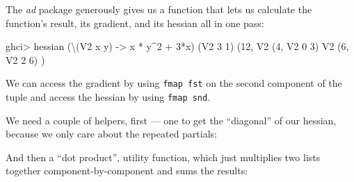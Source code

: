 \documentclass[]{article}
\newenvironment{Shaded}{}{}
\newcommand{\CommentTok}[1]{\textcolor[rgb]{0.38,0.63,0.69}{\textit{#1}}}
\newcommand{\DataTypeTok}[1]{\textcolor[rgb]{0.56,0.13,0.00}{#1}}
\newcommand{\DecValTok}[1]{\textcolor[rgb]{0.25,0.63,0.44}{#1}}
\newcommand{\FunctionTok}[1]{\textcolor[rgb]{0.02,0.16,0.49}{#1}}
\newcommand{\KeywordTok}[1]{\textcolor[rgb]{0.00,0.44,0.13}{\textbf{#1}}}
\newcommand{\NormalTok}[1]{#1}
\newcommand{\OperatorTok}[1]{\textcolor[rgb]{0.40,0.40,0.40}{#1}}
\newcommand{\OtherTok}[1]{\textcolor[rgb]{0.00,0.44,0.13}{#1}}
\begin{document}
The \emph{ad} package generously gives us a function that lets us calculate the
function's result, its gradient, and its hessian all in one pass:

\begin{Shaded}
\begin{Highlighting}[]
\NormalTok{ghci}\OperatorTok{>}\NormalTok{ hessian\textquotesingle{} (\textbackslash{}(}\DataTypeTok{V2}\NormalTok{ x y) }\OtherTok{{-}>}\NormalTok{ x }\OperatorTok{*}\NormalTok{ y}\OperatorTok{\^{}}\DecValTok{2} \OperatorTok{+} \DecValTok{3}\OperatorTok{*}\NormalTok{x) (}\DataTypeTok{V2} \DecValTok{3} \DecValTok{1}\NormalTok{)}
\NormalTok{(}\DecValTok{12}\NormalTok{, }\DataTypeTok{V2}\NormalTok{ (}\DecValTok{4}\NormalTok{, }\DataTypeTok{V2} \DecValTok{0} \DecValTok{3}\NormalTok{)}
     \DataTypeTok{V2}\NormalTok{ (}\DecValTok{6}\NormalTok{, }\DataTypeTok{V2} \DecValTok{2} \DecValTok{6}\NormalTok{)}
\NormalTok{)}
\end{Highlighting}
\end{Shaded}

We can access the gradient by using \texttt{fmap\ fst} on the second component
of the tuple and access the hessian by using \texttt{fmap\ snd}.

We need a couple of helpers, first --- one to get the ``diagonal'' of our
hessian, because we only care about the repeated partials:

\begin{Shaded}
\end{Shaded}

And then a ``dot product'', utility function, which just multiplies two lists
together component-by-component and sums the results:
\end{document}
